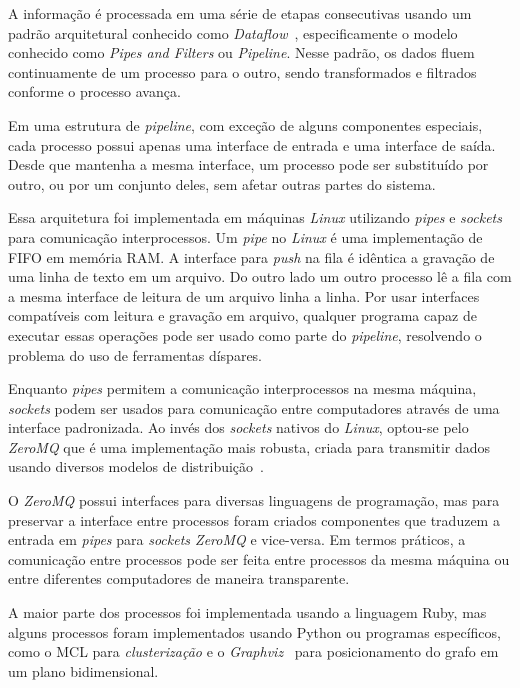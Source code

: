\documentclass[12pt,a4paper]{article}
\begin{document}
A informação é processada em uma série de etapas consecutivas usando um padrão arquitetural conhecido como \textit{Dataflow}~\cite{Carkci2014-jk, Hohpe2003-nj}, especificamente o modelo conhecido como \textit{Pipes and Filters} ou \textit{Pipeline}. Nesse padrão, os dados fluem continuamente de um processo para o outro, sendo transformados e filtrados conforme o processo avança. 

Em uma estrutura de \textit{pipeline}, com exceção de alguns componentes especiais, cada processo possui apenas uma interface de entrada e uma interface de saída. Desde que mantenha a mesma interface, um processo pode ser substituído por outro, ou por um conjunto deles, sem afetar outras partes do sistema.

Essa arquitetura foi implementada em máquinas \textit{Linux} utilizando \textit{pipes} e \textit{sockets} para comunicação interprocessos. Um \textit{pipe} no \textit{Linux} é uma implementação de FIFO em memória RAM. A interface para \textit{push} na fila é idêntica a gravação de uma linha de texto em um arquivo. Do outro lado um outro processo lê a fila com a mesma interface de leitura de um arquivo linha a linha. Por usar interfaces compatíveis com leitura e gravação em arquivo, qualquer programa capaz de executar essas operações pode ser usado como parte do \textit{pipeline}, resolvendo o problema do uso de ferramentas díspares.

Enquanto \textit{pipes} permitem a comunicação interprocessos na mesma máquina, \textit{sockets} podem ser usados para comunicação entre computadores através de uma interface padronizada. Ao invés dos \textit{sockets} nativos do \textit{Linux}, optou-se pelo \textit{ZeroMQ} que é uma implementação mais robusta, criada para transmitir dados usando diversos modelos de distribuição~\cite{Hintjens2013-tz}.

O \textit{ZeroMQ} possui interfaces para diversas linguagens de programação, mas para preservar a interface entre processos foram criados componentes que traduzem a entrada em \textit{pipes} para \textit{sockets ZeroMQ} e vice-versa. Em termos práticos, a comunicação entre processos pode ser feita entre processos da mesma máquina ou entre diferentes computadores de maneira transparente.

A maior parte dos processos foi implementada usando a linguagem Ruby, mas alguns processos foram implementados usando Python ou programas específicos, como o MCL para \textit{clusterização} e o \textit{Graphviz}~\cite{Gansner2000-oo} para posicionamento do grafo em um plano bidimensional.
\end{document}
